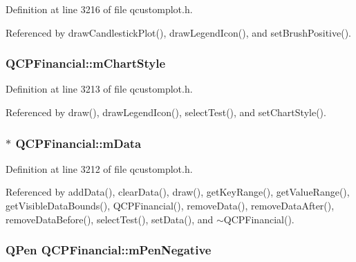 Definition at line 3216 of file qcustomplot.\+h.



Referenced by draw\+Candlestick\+Plot(), draw\+Legend\+Icon(), and set\+Brush\+Positive().

\hypertarget{class_q_c_p_financial_ab65c2ce8d6354451870bb44b894c1e92}{}
\subsubsection[{m\+Chart\+Style}]{ Q\+C\+P\+Financial\+::m\+Chart\+Style\hspace{0.3cm}{\ttfamily [protected]}}\label{class_q_c_p_financial_ab65c2ce8d6354451870bb44b894c1e92}


Definition at line 3213 of file qcustomplot.\+h.



Referenced by draw(), draw\+Legend\+Icon(), select\+Test(), and set\+Chart\+Style().

\hypertarget{class_q_c_p_financial_a475f63587ca1077d8c30aaf2b71ae026}{}
\subsubsection[{m\+Data}]{$\ast$ Q\+C\+P\+Financial\+::m\+Data\hspace{0.3cm}{\ttfamily [protected]}}\label{class_q_c_p_financial_a475f63587ca1077d8c30aaf2b71ae026}


Definition at line 3212 of file qcustomplot.\+h.



Referenced by add\+Data(), clear\+Data(), draw(), get\+Key\+Range(), get\+Value\+Range(), get\+Visible\+Data\+Bounds(), Q\+C\+P\+Financial(), remove\+Data(), remove\+Data\+After(), remove\+Data\+Before(), select\+Test(), set\+Data(), and $\sim$\+Q\+C\+P\+Financial().

\hypertarget{class_q_c_p_financial_a263fbfefde2cc19c8d4024a8319c2bbb}{}
\subsubsection[{m\+Pen\+Negative}]{\setlength{\rightskip}{0pt plus 5cm}Q\+Pen Q\+C\+P\+Financial\+::m\+Pen\+Negative\hspace{0.3cm}{\ttfamily [protected]}}\label{class_q_c_p_financial_a263fbfefde2cc19c8d4024a8319c2bbb}


